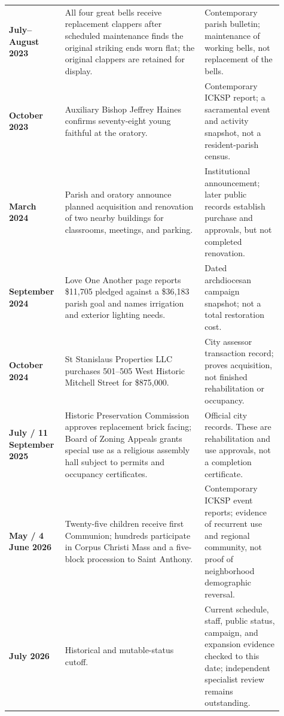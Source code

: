 \begin{longtable}{>{\bfseries\RaggedRight\arraybackslash}p{0.16\linewidth}>{\RaggedRight\arraybackslash}p{0.48\linewidth}>{\RaggedRight\arraybackslash}p{0.27\linewidth}}
July--August 2023 & All four great bells receive replacement clappers after scheduled maintenance finds the original striking ends worn flat; the original clappers are retained for display. & Contemporary parish bulletin; maintenance of working bells, not replacement of the bells.\\

28 October 2023 & Auxiliary Bishop Jeffrey Haines confirms seventy-eight young faithful at the oratory. & Contemporary ICKSP report; a sacramental event and activity snapshot, not a resident-parish census.\\

17 March 2024 & Parish and oratory announce planned acquisition and renovation of two nearby buildings for classrooms, meetings, and parking. & Institutional announcement; later public records establish purchase and approvals, but not completed renovation.\\

20 September 2024 & Love One Another page reports \$11,705 pledged against a \$36,183 parish goal and names irrigation and exterior lighting needs. & Dated archdiocesan campaign snapshot; not a total restoration cost.\\

17 October 2024 & St Stanislaus Properties LLC purchases 501--505 West Historic Mitchell Street for \$875,000. & City assessor transaction record; proves acquisition, not finished rehabilitation or occupancy.\\

7 July / 11 September 2025 & Historic Preservation Commission approves replacement brick facing; Board of Zoning Appeals grants special use as a religious assembly hall subject to permits and occupancy certificates. & Official city records. These are rehabilitation and use approvals, not a completion certificate.\\

3 May / 4 June 2026 & Twenty-five children receive first Communion; hundreds participate in Corpus Christi Mass and a five-block procession to Saint Anthony. & Contemporary ICKSP event reports; evidence of recurrent use and regional community, not proof of neighborhood demographic reversal.\\

19 July 2026 & Historical and mutable-status cutoff. & Current schedule, staff, public status, campaign, and expansion evidence checked to this date; independent specialist review remains outstanding.\\
\end{longtable}
